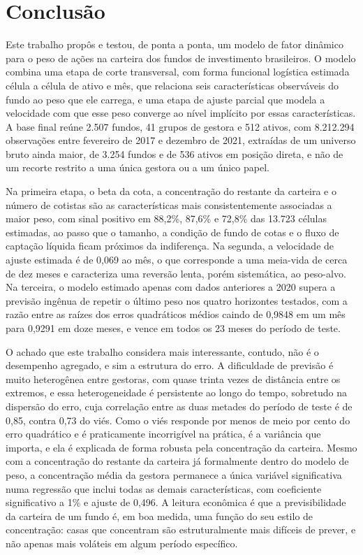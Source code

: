 \documentclass[12pt,a4paper]{article}
\begin{document}
\FloatBarrier

\clearpage
\section{Conclusão}
\label{sec:conclusao}

Este trabalho propôs e testou, de ponta a ponta, um modelo de fator dinâmico para o peso de
ações na carteira dos fundos de investimento brasileiros. O modelo combina uma etapa de corte
transversal, com forma funcional logística estimada célula a célula de ativo e mês, que
relaciona seis características observáveis do fundo ao peso que ele carrega, e uma etapa de
ajuste parcial que modela a velocidade com que esse peso converge ao nível implícito por
essas características. A base final reúne 2.507 fundos, 41 grupos de gestora e 512 ativos, com
8.212.294 observações entre fevereiro de 2017 e dezembro de 2021, extraídas de um universo
bruto ainda maior, de 3.254 fundos e de 536 ativos em posição direta, e não de um recorte
restrito a uma única gestora ou a um único papel.

Na primeira etapa, o beta da cota, a concentração do restante da carteira e o número de
cotistas são as características mais consistentemente associadas a maior peso, com sinal
positivo em 88,2\%, 87,6\% e 72,8\% das 13.723 células estimadas, ao passo que o tamanho, a
condição de fundo de cotas e o fluxo de captação líquida ficam próximos da indiferença. Na
segunda, a velocidade de ajuste estimada é de 0,069 ao mês, o que corresponde a uma meia-vida
de cerca de dez meses e caracteriza uma reversão lenta, porém sistemática, ao peso-alvo. Na
terceira, o modelo estimado apenas com dados anteriores a 2020 supera a previsão ingênua de
repetir o último peso nos quatro horizontes testados, com a razão entre as raízes dos erros
quadráticos médios caindo de 0,9848 em um mês para 0,9291 em doze meses, e vence em todos os
23 meses do período de teste.

O achado que este trabalho considera mais interessante, contudo, não é o desempenho agregado,
e sim a estrutura do erro. A dificuldade de previsão é muito heterogênea entre gestoras, com
quase trinta vezes de distância entre os extremos, e essa heterogeneidade é persistente ao
longo do tempo, sobretudo na dispersão do erro, cuja correlação entre as duas metades do
período de teste é de 0,85, contra 0,73 do viés. Como o viés responde por menos de meio por
cento do erro quadrático e é praticamente incorrigível na prática, é a variância que importa,
e ela é explicada de forma robusta pela concentração da carteira. Mesmo com a concentração do
restante da carteira já formalmente dentro do modelo de peso, a concentração média da gestora
permanece a única variável significativa numa regressão que inclui todas as demais
características, com coeficiente significativo a 1\% e ajuste de 0,496. A leitura econômica é
que a previsibilidade da carteira de um fundo é, em boa medida, uma função do seu estilo de
concentração: casas que concentram são estruturalmente mais difíceis de prever, e não apenas
mais voláteis em algum período específico.
\end{document}
